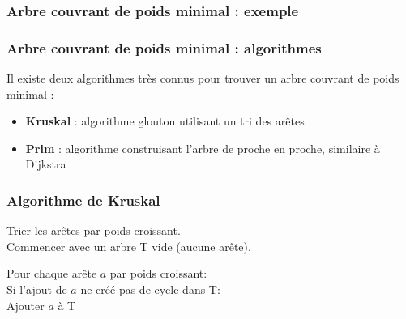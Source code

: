 \documentclass[draft]{beamer}
\begin{document}
\begin{frame}
    \frametitle{Arbre couvrant de poids minimal : exemple}
    \begin{figure}
    \end{figure}
\end{frame}

\begin{frame}
    \frametitle{Arbre couvrant de poids minimal : algorithmes}
    Il existe deux algorithmes très connus pour trouver un arbre couvrant de poids minimal :
    \begin{itemize}
        \item \textbf{Kruskal} : algorithme glouton utilisant un tri des arêtes
        \item \textbf{Prim} : algorithme construisant l'arbre de proche en proche, similaire à Dijkstra
    \end{itemize}
\end{frame}

\begin{frame}
    \frametitle{Algorithme de Kruskal}
    Trier les arêtes par poids croissant.\\
    Commencer avec un arbre T vide (aucune arête).
    \vspace{\baselineskip}

    Pour chaque arête $a$ par poids croissant:\\
    \hspace{.5cm} Si l'ajout de $a$ ne créé pas de cycle dans T:\\
    \hspace{1cm} Ajouter $a$ à T
\end{frame}
\end{document}
